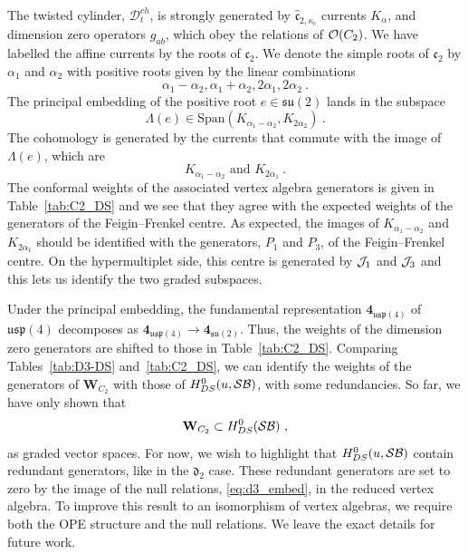 \documentclass[a4paper]{article}
\def\BB{{\cal B}}
\def\JJ{{\cal J}}
\def\OO{{\cal O}}
\def\SS{{\cal S}}
\def\suf{\mathfrak{su}}
\def\ccf{\mathfrak{c}}
\def\df{\mathfrak{d}}
\def\D{\mathcal{D}^{ch}}
\def\W{\mathbf{W}}
\begin{document}
The twisted cylinder, $\D_t$, is strongly generated by $\widehat{\ccf}_{2,\kappa_c}$ currents $K_\alpha$, and dimension zero operators $g_{ab}$, which obey the relations of $\OO(C_2)$. We have labelled the affine currents by the roots of $\ccf_2$. We denote the simple roots of $\ccf_2$ by $\alpha_1$ and $\alpha_2$ with positive roots given by the linear combinations
\begin{equation}
\alpha_1-\alpha_2, \alpha_1+\alpha_2,2\alpha_1, 2\alpha_2~.
\end{equation}
The principal embedding of the positive root $e\in\suf(2)$ lands in the subspace
\begin{equation}
	\Lambda(e) \in \mathrm{Span} (K_{\alpha_1-\alpha_2} , K_{2\alpha_2})~.
\end{equation}
The cohomology is generated by the currents that commute with the image of $\Lambda(e)$, which are
\begin{equation}
	K_{\alpha_1-\alpha_2}\text{ and } K_{2\alpha_1}~.
\end{equation}
The conformal weights of the associated vertex algebra generators is given in Table~\ref{tab:C2_DS} and we see that they agree with the expected weights of the generators of the Feigin--Frenkel centre. As expected, the images of $K_{\alpha_1-\alpha_2}$ and $K_{2\alpha_1}$ should be identified with the generators, $P_1$ and $P_3$, of the Feigin--Frenkel centre. On the hypermultiplet side, this centre is generated by $\JJ_1$ and $\JJ_3$ and this lets us identify the two graded subspaces.

Under the principal embedding, the fundamental representation $\mathbf{4}_{\mathfrak{usp}(4)}$ of $\mathfrak{usp}(4)$ decomposes as $\mathbf{ 4}_{\mathfrak{usp}(4)}\rightarrow \mathbf{4}_{\suf(2)}$. Thus, the weights of the dimension zero generators are shifted to those in Table~\ref{tab:C2_DS}. Comparing Tables~\ref{tab:D3-DS} and~\ref{tab:C2_DS}, we can identify the weights of the generators of $\W_{C_2}$ with those of $H^0_{DS}(u,\SS\BB)$, with some redundancies. So far, we have only shown that
\begin{equation}
	\W_{C_2}\subset H^0_{DS}(\SS\BB)~,
\end{equation}
as graded vector spaces. For now, we wish to highlight that $H^0_{DS}(u,\SS\BB)$ contain redundant generators, like in the $\df_2$ case. These redundant generators are set to zero by the image of the null relations, \eqref{eq:d3_embed}, in the reduced vertex algebra. To improve this result to an isomorphism of vertex algebras, we require both the OPE structure and the null relations. We leave the exact details for future work.




\end{document}

